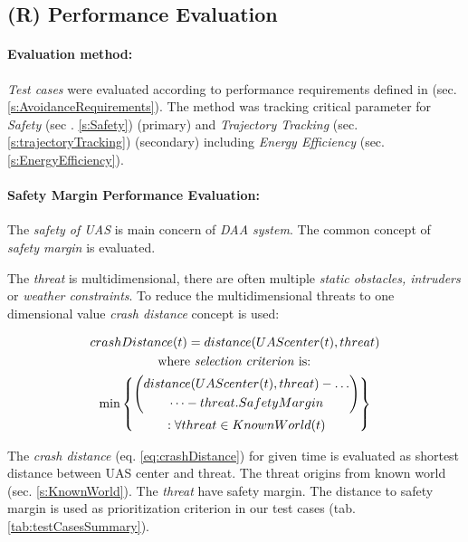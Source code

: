 \subsection{(R) Performance Evaluation}\label{s:performanceEvaluation}
\paragraph{Evaluation method:} \emph{Test cases} were evaluated according to performance requirements defined in (sec. \ref{s:AvoidanceRequirements}). The method was tracking critical parameter for \emph{Safety} (sec . \ref{s:Safety}) (primary) and \emph{Trajectory Tracking} (sec. \ref{s:trajectoryTracking}) (secondary) including \emph{Energy Efficiency} (sec. \ref{s:EnergyEfficiency}).

\paragraph{Safety Margin Performance Evaluation:} The \emph{safety of UAS} is main concern of \emph{DAA system}. The common concept of \emph{safety margin} is evaluated. 

The \emph{threat} is multidimensional, there are often multiple \emph{static obstacles, intruders} or \emph{weather constraints}. To reduce the multidimensional threats to one dimensional value \emph{crash distance} concept is used:

\begin{multline}\label{eq:crashDistance}
    crashDistance(t) =  distance(UAScenter(t),threat) \\\text{  where \emph{selection criterion} is:  }\\ \min \left\{\begin{gathered}\left( \begin{gathered} distance(UAScenter(t),threat)-\dots\\\dots-threat.SafetyMargin\end{gathered}\right)\\:\forall threat \in KnownWorld (t)\end{gathered}\right\}
\end{multline}

The \emph{crash distance} (eq. \ref{eq:crashDistance}) for given time is evaluated as shortest distance between UAS center and threat. The threat origins from known world (sec. \ref{s:KnownWorld}). The \emph{threat} have safety margin. The distance to safety margin is used as prioritization criterion in our test cases (tab. \ref{tab:testCasesSummary}).


